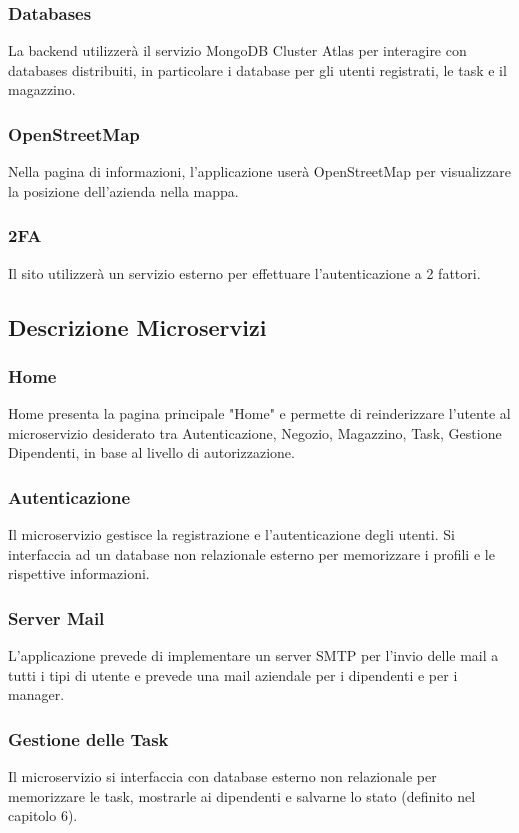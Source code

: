 \documentclass{report}
\begin{document}
\subsubsection{Databases}
La backend utilizzerà il servizio MongoDB Cluster Atlas per interagire con databases distribuiti, in particolare i database per gli utenti registrati, le task e il magazzino.

\subsubsection{OpenStreetMap}
Nella pagina di informazioni, l'applicazione userà OpenStreetMap per visualizzare la posizione dell'azienda nella mappa.

\subsubsection{2FA}
Il sito utilizzerà un servizio esterno per effettuare l'autenticazione a 2 fattori.

\subsection{Descrizione Microservizi}

\subsubsection*{Home}
Home presenta la pagina principale "Home" e permette di reinderizzare l'utente al microservizio desiderato tra Autenticazione, Negozio, Magazzino, Task, Gestione Dipendenti, in base al livello di autorizzazione.

\subsubsection*{Autenticazione}
Il microservizio gestisce la registrazione e l'autenticazione degli utenti. Si interfaccia ad un database non relazionale esterno per memorizzare i profili e le rispettive informazioni.

\subsubsection*{Server Mail}
L'applicazione prevede di implementare un server SMTP per l’invio delle mail a tutti i tipi di utente e prevede una mail aziendale per i dipendenti e per i manager.

\subsubsection*{Gestione delle Task}
Il microservizio si interfaccia con database esterno non relazionale per memorizzare le task, mostrarle ai dipendenti e salvarne lo stato (definito nel capitolo 6).
\end{document}
